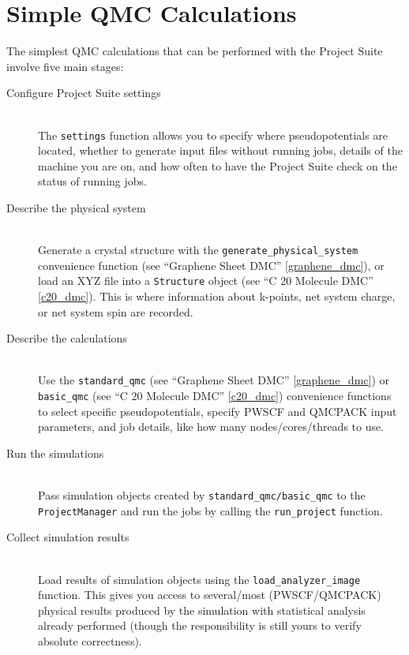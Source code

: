 \documentclass[oneside,11pt]{memoir}
\numberwithin{equation}{section}
\begin{document}
\pagebreak
\section{Simple QMC Calculations} \label{simple_qmc}
The simplest QMC calculations that can be performed with the Project Suite 
involve five main stages:
\begin{description}
  \item[Configure Project Suite settings] \hfill \\
    The \texttt{settings} function allows you to specify where pseudopotentials 
    are located, whether to generate input files without running jobs, details 
    of the machine you are on, and how often to have the Project Suite check 
    on the status of running jobs.  

  \item[Describe the physical system] \hfill \\
    Generate a crystal structure with the \texttt{generate\_physical\_system} 
    convenience function (see ``Graphene Sheet DMC'' \ref{graphene_dmc}), 
    or load an XYZ file into a \texttt{Structure} object 
    (see ``C 20 Molecule DMC'' \ref{c20_dmc}).  This is where 
    information about k-points, net system charge, or net system spin are 
    recorded.

  \item[Describe the calculations] \hfill \\
    Use the \texttt{standard\_qmc} (see ``Graphene Sheet DMC'' 
    \ref{graphene_dmc}) or \texttt{basic\_qmc} (see ``C 20 Molecule DMC'' 
    \ref{c20_dmc}) convenience functions 
    to select specific pseudopotentials, specify PWSCF and QMCPACK input 
    parameters, and job details, like how many nodes/cores/threads to use.

  \item[Run the simulations] \hfill \\
    Pass simulation objects created by \texttt{standard\_qmc/basic\_qmc} to 
    the \texttt{ProjectManager} and run the jobs by calling the 
    \texttt{run\_project} function.

  \item[Collect simulation results] \hfill \\
    Load results of simulation objects using the \texttt{load\_analyzer\_image} 
    function.  This gives you access to several/most (PWSCF/QMCPACK) physical 
    results produced by the simulation with statistical analysis already 
    performed (though the responsibility is still yours to verify absolute 
    correctness).
\end{description}
\end{document}
